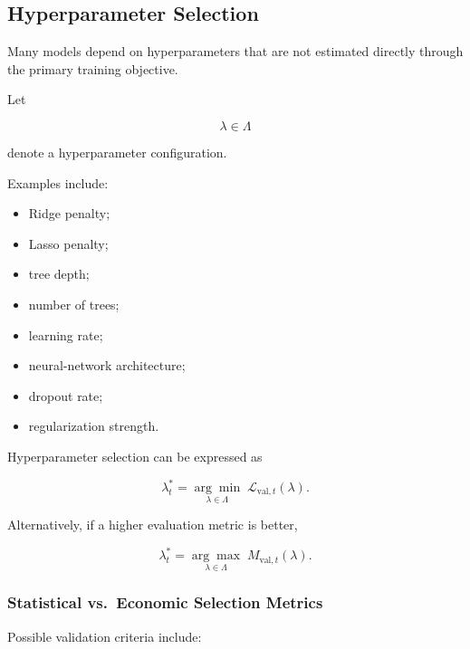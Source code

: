 \documentclass[11pt,a4paper]{article}
\begin{document}
\subsection{Hyperparameter Selection}
\label{subsec:hyperparameter_selection}

Many models depend on hyperparameters that are not estimated directly through
the primary training objective.

Let

\begin{equation}
\lambda
\in
\Lambda
\end{equation}

denote a hyperparameter configuration.

Examples include:

\begin{itemize}
    \item Ridge penalty;
    \item Lasso penalty;
    \item tree depth;
    \item number of trees;
    \item learning rate;
    \item neural-network architecture;
    \item dropout rate;
    \item regularization strength.
\end{itemize}

Hyperparameter selection can be expressed as

\begin{equation}
\boxed{
\lambda_t^*
=
\underset{\lambda\in\Lambda}{\arg\min}
\;
\mathcal{L}_{\mathrm{val},t}(\lambda).
}
\end{equation}

Alternatively, if a higher evaluation metric is better,

\begin{equation}
\lambda_t^*
=
\underset{\lambda\in\Lambda}{\arg\max}
\;
M_{\mathrm{val},t}(\lambda).
\end{equation}


\subsubsection{Statistical vs.\ Economic Selection Metrics}

Possible validation criteria include:
\end{document}
